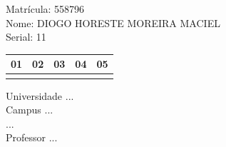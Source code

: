 \documentclass[10pt,a4paper,twocolumn]{report}
\begin{document}
Matrícula: 558796\\ Nome: DIOGO HORESTE MOREIRA MACIEL \\ Serial: 11\\
\begin{tabular}{|l|l|l|l|l|}\hline
01  &02  &03  &04  &05 \\ \hline 
 & & & & \\ \hline 
\end{tabular}
 \cleardoublepage 

\begin{flushleft}
Universidade ...\\
Campus ...\\
...\\
Professor ...\\
\end{flushleft}
\end{document}
